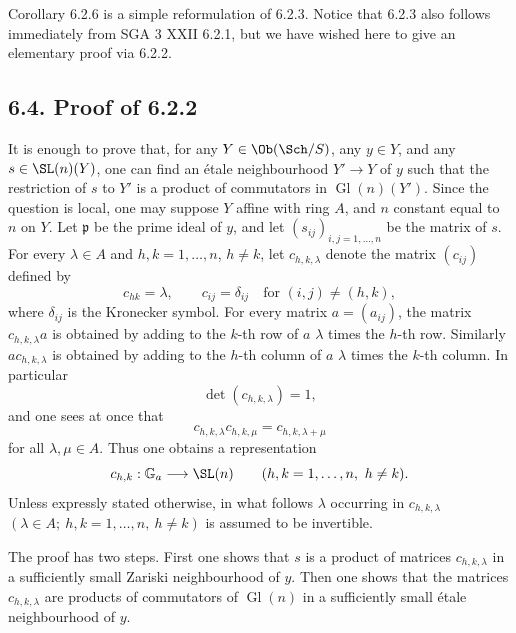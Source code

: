 \documentclass[11pt]{article}
\providecommand{\Gl}{\operatorname{Gl}}
\begin{document}
Corollary 6.2.6 is a simple reformulation of 6.2.3. Notice that 6.2.3 also follows immediately from SGA 3 XXII 6.2.1, but we have wished here to give an elementary proof via 6.2.2.

\subsection*{6.4. Proof of 6.2.2}
It is enough to prove that, for any \(Y\in\Ob(\Sch/S)\), any \(y\in Y\), and any \(s\in\SL(n)(Y)\), one can find an étale neighbourhood \(Y'\to Y\) of \(y\) such that the restriction of \(s\) to \(Y'\) is a product of commutators in \(\Gl(n)(Y')\). Since the question is local, one may suppose \(Y\) affine with ring \(A\), and \(n\) constant equal to \(n\) on \(Y\). Let \(\mathfrak p\) be the prime ideal of \(y\), and let \((s_{ij})_{i,j=1,\ldots,n}\) be the matrix of \(s\). For every \(\lambda\in A\) and \(h,k=1,\ldots,n\), \(h\ne k\), let \(c_{h,k,\lambda}\) denote the matrix \((c_{ij})\) defined by
\[
 c_{hk}=\lambda,\qquad c_{ij}=\delta_{ij}\quad\text{for }(i,j)\ne(h,k),
\]
where \(\delta_{ij}\) is the Kronecker symbol. For every matrix \(a=(a_{ij})\), the matrix \(c_{h,k,\lambda}a\) is obtained by adding to the \(k\)-th row of \(a\) \(\lambda\) times the \(h\)-th row. Similarly \(ac_{h,k,\lambda}\) is obtained by adding to the \(h\)-th column of \(a\) \(\lambda\) times the \(k\)-th column. In particular
\[
 \det(c_{h,k,\lambda})=1,
\]
and one sees at once that
\begin{equation}\tag{6.3.1}
 c_{h,k,\lambda}c_{h,k,\mu}=c_{h,k,\lambda+\mu}
\end{equation}
for all \(\lambda,\mu\in A\). Thus one obtains a representation
\[
 c_{h,k}:\mathbb G_a\longrightarrow\SL(n)
 \qquad(h,k=1,\ldots,n,\ h\ne k).
\]
Unless expressly stated otherwise, in what follows \(\lambda\) occurring in \(c_{h,k,\lambda}\) \((\lambda\in A;\ h,k=1,\ldots,n,\ h\ne k)\) is assumed to be invertible.

The proof has two steps. First one shows that \(s\) is a product of matrices \(c_{h,k,\lambda}\) in a sufficiently small Zariski neighbourhood of \(y\). Then one shows that the matrices \(c_{h,k,\lambda}\) are products of commutators of \(\Gl(n)\) in a sufficiently small étale neighbourhood of \(y\).
\end{document}
